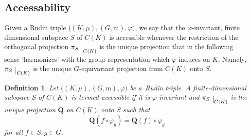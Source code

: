 \documentclass[12pt]{amsart}
\numberwithin{subsection}{section}
\newtheorem{definition}[theorem]{Definition}
\theoremstyle{definition}
\theoremstyle{remark}
\newcommand\restrict[1]{\raisebox{-.5ex}{ $\vert $}_{#1}}
\begin{document}


\smallskip



\subsection{Accessability} \label{access}

Given a Rudin triple $\big((K,\mu),
(G, \mathrm{m}),\varphi\big)$, we  say that the 
 $\varphi$-invariant, finite dimensional subspace $S$ of $C(K)$ is accessible whenever the restriction of  the orthogonal projection $\pi_S\restrict{C(K)}$ is the unique projection that in the following sense 'harmonizes' with the group representation which $\varphi$
induces on $K$. Namely, $\pi_S\restrict{C(K)}$ is the unique $G$-equivariant projection from $C(K)$ onto $S$.


\begin{definition}
Let $\big((K,\mu),
(G, \mathrm{m}),\varphi\big)$ be a~Rudin triple.
A finite-dimensional subspace $S$ of $C(K)$ is termed  accessible if it is $\varphi$-invariant and  $\pi_S\restrict{C(K)}$ is the unique projection $\mathbf{Q}$ on $C(K)$ onto $S$ such that
$$\mathbf{Q} (f \circ \varphi_g) = \mathbf{Q}(f) \circ \varphi_g$$
for all $f \in S, g \in G$.
\end{definition}
\end{document}
